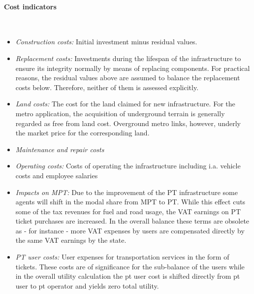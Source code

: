 \paragraph{Cost indicators}\mbox{}\\[-5ex]
\begin{itemize}
	\item \textit{Construction costs:} Initial investment minus residual values.
	\item \textit{Replacement costs:} Investments during the lifespan of the infrastructure to ensure its integrity normally by means of replacing components. For practical reasons, the residual values above are assumed to balance the replacement costs below. Therefore, neither of them is assessed explicitly.
	\item \textit{Land costs:} The cost for the land claimed for new infrastructure. For the metro application, the acquisition of underground terrain is generally regarded as free from land cost. Overground metro links, however, underly the market price for the corresponding land.
	\item \textit{Maintenance and repair costs}
	\item \textit{Operating costs:} Costs of operating the infrastructure including i.a. vehicle costs and employee salaries
	\item \textit{Impacts on MPT:} Due to the improvement of the PT infrastructure some agents will shift in the modal share from MPT to PT. While this effect cuts some of the tax revenues for fuel and road usage, the VAT earnings on PT ticket purchases are increased. In the overall balance these terms are obsolete as - for instance - more VAT expenses by users are compensated directly by the same VAT earnings by the state.
	\item \textit{PT user costs:} User expenses for transportation services in the form of tickets. These costs are of significance for the sub-balance of the users while in the overall utility calculation the pt user cost is shifted directly from pt user to pt operator and yields zero total utility.
	
\end{itemize}


